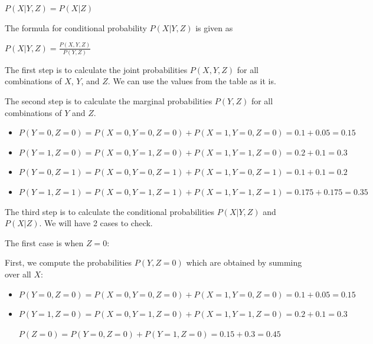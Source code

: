 \documentclass[12pt,letterpaper, onecolumn]{exam}
\begin{document}
\begin{questions}
\begin{parts}
\begin{subparts}
\begin{solution}
                \begin{center}
                    $\displaystyle{P(X|Y,Z) = P(X|Z)}$
                \end{center}

                The formula for conditional probability $P(X|Y,Z)$ is given as

                \begin{center}
                    $\displaystyle{P(X|Y,Z) = \frac{P(X,Y,Z)}{P(Y,Z)}}$
                \end{center}

                The first step is to calculate the joint probabilities $P(X,Y,Z)$ for all combinations of $X$, $Y$, and $Z$.
                We can use the values from the table as it is.

                The second step is to calculate the marginal probabilities $P(Y,Z)$ for all combinations of $Y$ and $Z$.

                \begin{itemize}
                    \item $P(Y=0,Z=0) = P(X=0,Y=0,Z=0) + P(X=1,Y=0,Z=0) = 0.1 + 0.05 = 0.15$
                    \item $P(Y=1,Z=0) = P(X=0,Y=1,Z=0) + P(X=1,Y=1,Z=0) = 0.2 + 0.1 = 0.3$
                    \item $P(Y=0,Z=1) = P(X=0,Y=0,Z=1) + P(X=1,Y=0,Z=1) = 0.1 + 0.1 = 0.2$
                    \item $P(Y=1,Z=1) = P(X=0,Y=1,Z=1) + P(X=1,Y=1,Z=1) = 0.175 + 0.175 = 0.35$
                \end{itemize}

                The third step is to calculate the conditional probabilities $P(X|Y,Z)$ and $P(X|Z)$. We will have 2 cases to check.

                The first case is when $Z=0$:

                First, we compute the probabilities $P(Y, Z=0)$ which are obtained by summing over all $X$:

                \begin{itemize}
                    \item $P(Y=0, Z=0) = P(X=0, Y=0, Z=0) + P(X=1, Y=0, Z=0) = 0.1 + 0.05 = 0.15$
                    \item $P(Y=1, Z=0) = P(X=0, Y=1, Z=0) + P(X=1, Y=1, Z=0) = 0.2 + 0.1 = 0.3$
                    
                    \begin{center}
                        $P(Z=0) = P(Y=0, Z=0) + P(Y=1, Z=0) = 0.15 + 0.3 = 0.45$
                    \end{center}
                \end{itemize}


\end{solution}
\end{subparts}
\end{parts}
\end{questions}
\end{document}
